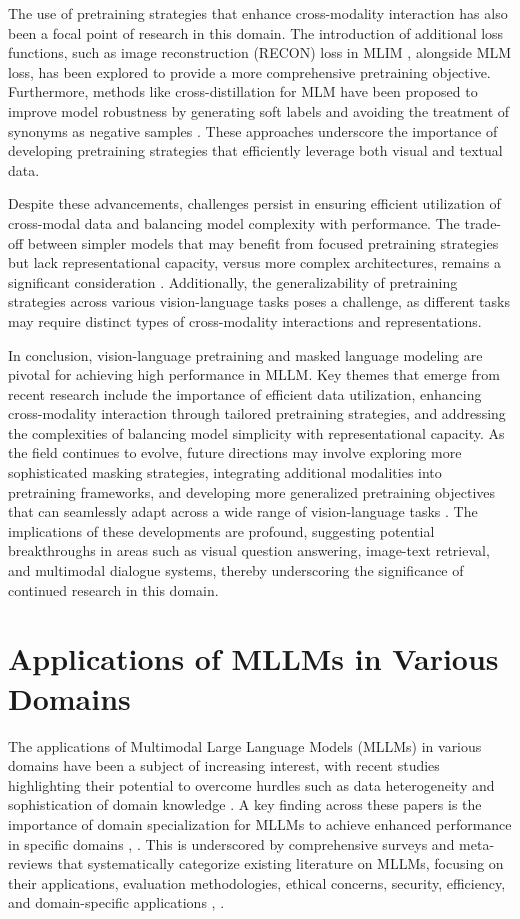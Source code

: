 \documentclass[conference]{IEEEtran}
\begin{document}
The use of pretraining strategies that enhance cross-modality interaction has also been a focal point of research in this domain. The introduction of additional loss functions, such as image reconstruction (RECON) loss in MLIM \cite{b3}, alongside MLM loss, has been explored to provide a more comprehensive pretraining objective. Furthermore, methods like cross-distillation for MLM have been proposed to improve model robustness by generating soft labels and avoiding the treatment of synonyms as negative samples \cite{b5}. These approaches underscore the importance of developing pretraining strategies that efficiently leverage both visual and textual data.

Despite these advancements, challenges persist in ensuring efficient utilization of cross-modal data and balancing model complexity with performance. The trade-off between simpler models that may benefit from focused pretraining strategies but lack representational capacity, versus more complex architectures, remains a significant consideration \cite{b6}. Additionally, the generalizability of pretraining strategies across various vision-language tasks poses a challenge, as different tasks may require distinct types of cross-modality interactions and representations.

In conclusion, vision-language pretraining and masked language modeling are pivotal for achieving high performance in MLLM. Key themes that emerge from recent research include the importance of efficient data utilization, enhancing cross-modality interaction through tailored pretraining strategies, and addressing the complexities of balancing model simplicity with representational capacity. As the field continues to evolve, future directions may involve exploring more sophisticated masking strategies, integrating additional modalities into pretraining frameworks, and developing more generalized pretraining objectives that can seamlessly adapt across a wide range of vision-language tasks \cite{b7}. The implications of these developments are profound, suggesting potential breakthroughs in areas such as visual question answering, image-text retrieval, and multimodal dialogue systems, thereby underscoring the significance of continued research in this domain.

\section{Applications of MLLMs in Various Domains}
The applications of Multimodal Large Language Models (MLLMs) in various domains have been a subject of increasing interest, with recent studies highlighting their potential to overcome hurdles such as data heterogeneity and sophistication of domain knowledge \cite{b1}. A key finding across these papers is the importance of domain specialization for MLLMs to achieve enhanced performance in specific domains \cite{b2}, \cite{b3}. This is underscored by comprehensive surveys and meta-reviews that systematically categorize existing literature on MLLMs, focusing on their applications, evaluation methodologies, ethical concerns, security, efficiency, and domain-specific applications \cite{b4}, \cite{b5}.
\end{document}
